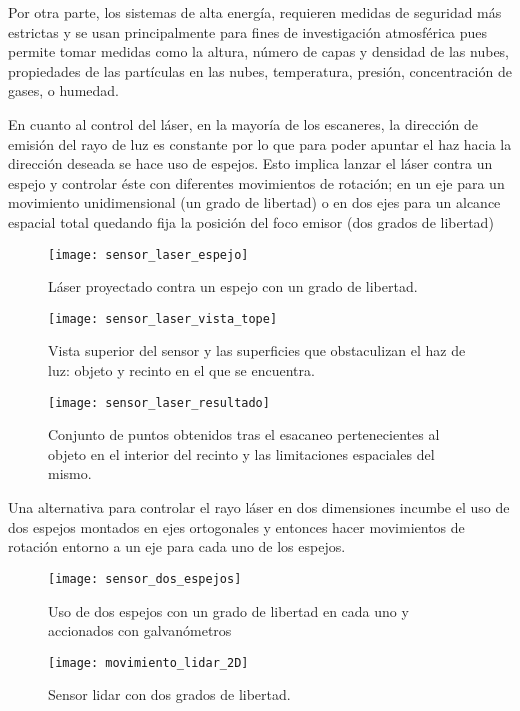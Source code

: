 Por otra parte, los sistemas de alta energía, requieren medidas de seguridad más estrictas y se usan principalmente para fines de investigación atmosférica pues permite tomar medidas como la altura, número de capas y densidad de las nubes, propiedades de las partículas en las nubes, temperatura, presión, concentración de gases, o humedad.

En cuanto al control del láser\cite{control_laser}, en la mayoría de los escaneres, la dirección de emisión del rayo de luz es constante por lo que para poder apuntar el haz hacia la dirección deseada se hace uso de espejos. Esto implica lanzar el láser contra un espejo y controlar éste con diferentes movimientos de rotación; en un eje para un movimiento unidimensional (un grado de libertad) o en dos ejes para un alcance espacial total quedando fija la posición del foco emisor (dos grados de libertad)

\begin{figure}[!htb]
  \texttt{[image: sensor\_laser\_espejo]}
  \caption{Láser proyectado contra un espejo con un grado de libertad.}\label{fig:sensor laser completo - espejo}
\endminipage\hfill
{}
  \texttt{[image: sensor\_laser\_vista\_tope]}
  \caption{Vista superior del sensor y las superficies que obstaculizan el haz de luz: objeto y recinto en el que se encuentra.}\label{fig:sensor laser completo - vista tope}
\endminipage\hfill
{}
  \texttt{[image: sensor\_laser\_resultado]}
  \caption{Conjunto de puntos obtenidos tras el esacaneo pertenecientes al objeto en el interior del recinto y las limitaciones espaciales del mismo.}\label{fig:sensor laser completo - resultado}
\endminipage
\end{figure}

Una alternativa para controlar el rayo láser en dos dimensiones incumbe el uso de dos espejos montados en ejes ortogonales y entonces hacer movimientos de rotación entorno a un eje para cada uno de los espejos.

\begin{figure}
  \texttt{[image: sensor\_dos\_espejos]}
  \caption{Uso de dos espejos con un grado de libertad en cada uno y accionados con galvanómetros}\label{fig:sensor dos espejos}
\endminipage\hfill
{}
  \texttt{[image: movimiento\_lidar\_2D]}
  \caption{Sensor lidar con dos grados de libertad.}\label{fig:movimiento lidar 2D}
\endminipage\hfill

\end{figure}


